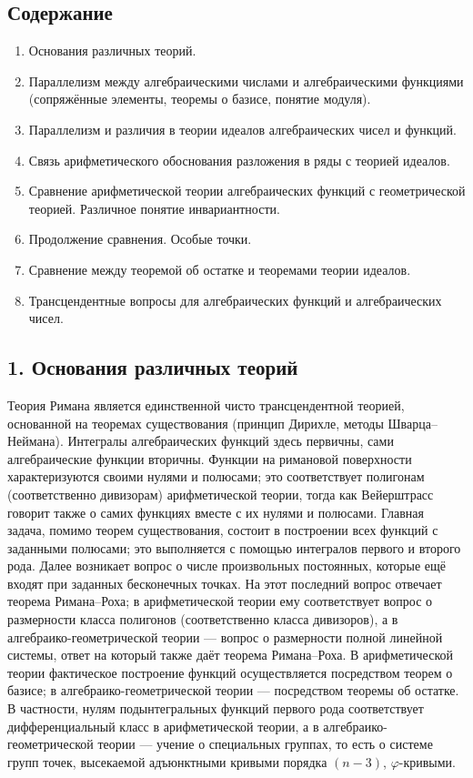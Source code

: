 \documentclass[11pt]{article}
\begin{document}
\subsection*{Содержание}
\begin{enumerate}
\item Основания различных теорий.
\item Параллелизм между алгебраическими числами и алгебраическими функциями (сопряжённые элементы, теоремы о базисе, понятие модуля).
\item Параллелизм и различия в теории идеалов алгебраических чисел и функций.
\item Связь арифметического обоснования разложения в ряды с теорией идеалов.
\item Сравнение арифметической теории алгебраических функций с геометрической теорией. Различное понятие инвариантности.
\item Продолжение сравнения. Особые точки.
\item Сравнение между теоремой об остатке и теоремами теории идеалов.
\item Трансцендентные вопросы для алгебраических функций и алгебраических чисел.
\end{enumerate}

\subsection*{1. Основания различных теорий}
Теория Римана является единственной чисто трансцендентной теорией, основанной на теоремах существования (принцип Дирихле, методы Шварца--Неймана). Интегралы алгебраических функций здесь первичны, сами алгебраические функции вторичны. Функции на римановой поверхности характеризуются своими нулями и полюсами; это соответствует полигонам (соответственно дивизорам) арифметической теории, тогда как Вейерштрасс говорит также о самих функциях вместе с их нулями и полюсами. Главная задача, помимо теорем существования, состоит в построении всех функций с заданными полюсами; это выполняется с помощью интегралов первого и второго рода. Далее возникает вопрос о числе произвольных постоянных, которые ещё входят при заданных бесконечных точках. На этот последний вопрос отвечает теорема Римана--Роха; в арифметической теории ему соответствует вопрос о размерности класса полигонов (соответственно класса дивизоров), а в алгебраико-геометрической теории --- вопрос о размерности полной линейной системы, ответ на который также даёт теорема Римана--Роха. В арифметической теории фактическое построение функций осуществляется посредством теорем о базисе; в алгебраико-геометрической теории --- посредством теоремы об остатке. В частности, нулям подынтегральных функций первого рода соответствует дифференциальный класс в арифметической теории, а в алгебраико-геометрической теории --- учение о специальных группах, то есть о системе групп точек, высекаемой адъюнктными кривыми порядка \((n-3)\), \(\varphi\)-кривыми.
\end{document}

